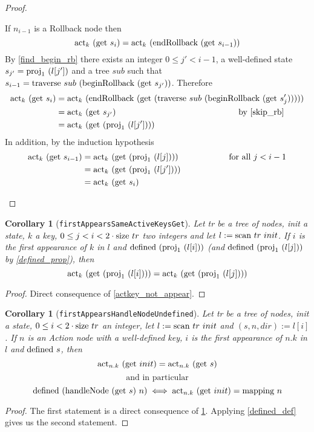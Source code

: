 \documentclass{article}
\newtheorem{corollary}[lemma]{Corollary}
\newcommand{\textfun}[1]{\textup{#1}}
\newcommand{\textcode}[1]{\texttt{#1}}
\newcommand{\traverse}[2]{\textfun{traverse}\ #1\ #2}
\newcommand{\scan}[2]{\textfun{scan}\ #1\ #2}
\newcommand{\hNode}[2]{\textfun{handleNode}\ #1\ #2}
\newcommand{\beginRb}[1]{\textfun{beginRollback}\ #1}
\newcommand{\enRb}[1]{\textfun{endRollback}\ #1}
\newcommand{\defined}[1]{\textfun{defined}\ #1}
\newcommand{\get}[1]{\textfun{get}\ #1}
\newcommand{\mapping}[1]{\textfun{mapping}\ #1}
\newcommand{\size}[1]{\textfun{size}\ #1}
\newcommand{\fst}[1]{\textfun{proj}_1\ #1}
\newcommand{\actkey}[2]{\textfun{act}_{#1}\ #2}
\begin{document}
\begin{proof}
\begin{itemize}
        If $n_{i - 1}$ is a Rollback node then
        \[\actkey{k}{(\get{s_i})} = \actkey{k}{(\enRb{(\get{s_{i - 1}})})} \]
        By \cref{find_begin_rb} there exists an integer $0 \leq j' < i - 1$, a well-defined state $s_{j'} = \fst{(l[j'])}$ and a tree $sub$ such that $s_{i - 1} = \traverse{sub}{(\beginRb{(\get{s_{j'}})})}$. Therefore
        \begin{align*}
            \actkey{k}{(\get{s_i})} &= \actkey{k}{(\enRb{(\get{(\traverse{sub}{(\beginRb{(\get{s_j'})})})})})} \\
            &= \actkey{k}{(\get{s_{j'}})} \text{\hskip 14.5em by \cref{skip_rb}} \\
            &= \actkey{k}{(\get{(\fst{(l[j'])})})}
        \end{align*}
        In addition, by the induction hypothesis
        \begin{align*}
        \actkey{k}{(\get{s_{i - 1}})} &= \actkey{k}{(\get{(\fst{(l[j])})})} \text{\hskip 6em for all $j < i - 1$} \\
        &= \actkey{k}{(\get{(\fst{(l[j'])})})} \\
        &= \actkey{k}{(\get{s_i})}
        \end{align*}
    \end{itemize} 
    
\end{proof}

\begin{corollary}[\textcode{firstAppearsSameActiveKeysGet}]
    \label{actkey_first_appear}
    Let tr be a tree of nodes, init a state, $k$ a key, $0 \leq j < i < 2\cdot \size{tr}$ two integers and let $l := \scan{tr}{init}$. 
    If $i$ is the first appearance of $k$ in $l$ and $\defined{(\fst{(l[i])})}$ (and  $\defined{(\fst{(l[j])})}$ by \cref{defined_prop}), then 
    \[\actkey{k}{(\get{(\fst{(l[i])})})} = \actkey{k}{(\get{(\fst{(l[j])})})}\]
\end{corollary}
\begin{proof}
    Direct consequence of \cref{actkey_not_appear}.
\end{proof}

\begin{corollary}[\textcode{firstAppearsHandleNodeUndefined}]
    \label{defined_first_appear}
    Let tr be a tree of nodes, init a state, $0 \leq i < 2\cdot \size{tr}$ an integer, let $l := \scan{tr}{init}$ and $(s, n, dir) := l[i]$. 
    If $n$ is an Action node with a well-defined key, $i$ is the first appearance of $n.k$ in $l$ and $\defined{s}$, then 
    \[\actkey{n.k}{(\get{init})} = \actkey{n.k}{(\get{s})}\]
    \[\text{and in particular}\] 
    \[\defined{(\hNode{(\get{s})}{n})} \iff \actkey{n.k}{(\get{init})} = \mapping{n}\]
\end{corollary}
\begin{proof}
    The first statement is a direct consequence of \cref{actkey_first_appear}. Applying \cref{defined_def} gives us the second statement.
\end{proof}
\end{document}
